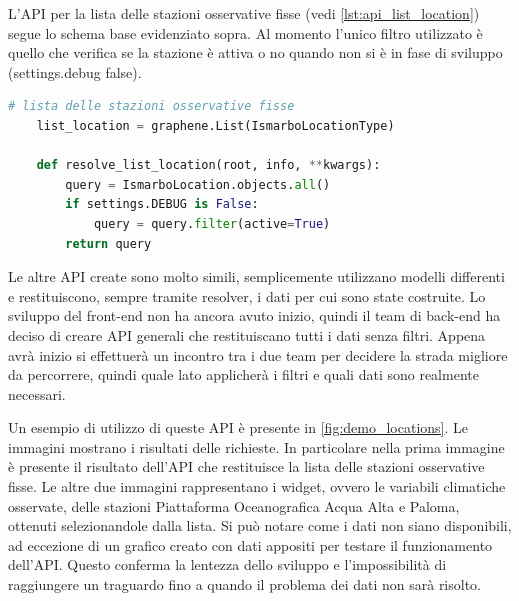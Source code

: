 \documentclass[./main.tex]{subfiles}
\begin{document}
L'API per la lista delle stazioni osservative fisse (vedi \autoref{lst:api_list_location}) segue lo schema base evidenziato sopra. Al momento l'unico filtro utilizzato è quello che verifica se la stazione è attiva o no quando non si è in fase di sviluppo (settings.debug false).

\begin{lstlisting}[language=python, caption=API lista stazioni osservative fisse, label=lst:api_list_location]
    # lista delle stazioni osservative fisse
    list_location = graphene.List(IsmarboLocationType)

    def resolve_list_location(root, info, **kwargs):
        query = IsmarboLocation.objects.all()
        if settings.DEBUG is False:
            query = query.filter(active=True)
        return query
\end{lstlisting}

Le altre API create sono molto simili, semplicemente utilizzano modelli differenti e restituiscono, sempre tramite resolver, i dati per cui sono state costruite. Lo sviluppo del front-end non ha ancora avuto inizio, quindi il team di back-end ha deciso di creare API generali che restituiscano tutti i dati senza filtri. Appena avrà inizio si effettuerà un incontro tra i due team per decidere la strada migliore da percorrere, quindi quale lato applicherà i filtri e quali dati sono realmente necessari.\par

Un esempio di utilizzo di queste API è presente in \autoref{fig:demo_locations}. Le immagini mostrano i risultati delle richieste. In particolare nella prima immagine è presente il risultato dell'API che restituisce la lista delle stazioni osservative fisse. Le altre due immagini rappresentano i widget, ovvero le variabili climatiche osservate, delle stazioni Piattaforma Oceanografica Acqua Alta e Paloma, ottenuti selezionandole dalla lista. Si può notare come i dati non siano disponibili, ad eccezione di un grafico creato con dati appositi per testare il funzionamento dell'API. Questo conferma la lentezza dello sviluppo e l'impossibilità di raggiungere un traguardo fino a quando il problema dei dati non sarà risolto.
\end{document}
